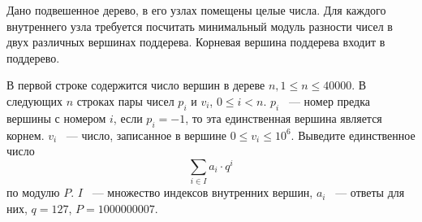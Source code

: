 Дано подвешенное дерево, в его узлах помещены целые числа.
Для каждого внутреннего узла требуется посчитать минимальный
модуль разности чисел в двух различных вершинах поддерева.
Корневая вершина поддерева входит в поддерево.

\InputFile
В первой строке содержится число вершин в дереве $n, 1 \le n \le 40000$.
В следующих $n$ строках пары чисел $p_i$ и $v_i$, $0 \le i < n$. $p_i$ ~---
номер предка вершины с номером $i$, если $p_i = -1$, то эта единственная
вершина является корнем. $v_i$ ~--- число, записанное в вершине
$0 \le v_i \le 10^6$.
\OutputFile
Выведите единственное число
$$
    \sum_{i \in I} a_i\cdot q^i
$$ по модулю $P$.
$I$ ~--- множество индексов внутренних вершин,
$a_i$ ~--- ответы для них,
$q =127$, $P = 1000000007$.

